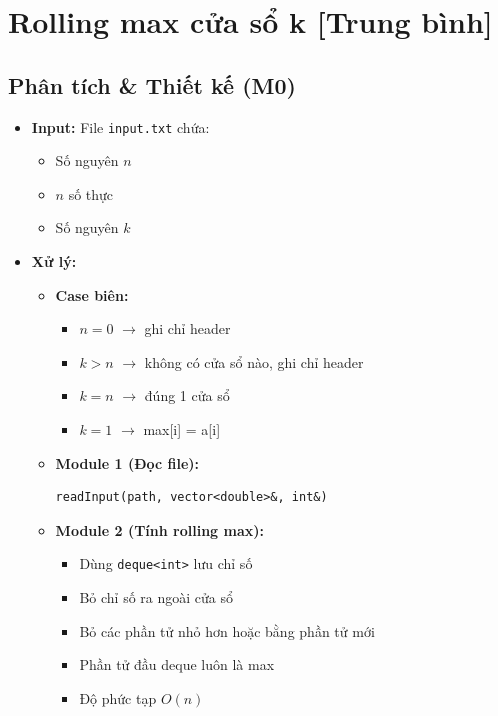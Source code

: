 \section{Rolling max cửa sổ k [Trung bình]}
\subsection{Phân tích \& Thiết kế (M0)}

\begin{itemize}
    \item \textbf{Input:} File \texttt{input.txt} chứa:
    \begin{itemize}
        \item Số nguyên $n$
        \item $n$ số thực
        \item Số nguyên $k$
    \end{itemize}

    \item \textbf{Xử lý:}
    \begin{itemize}
        \item \textbf{Case biên:}
        \begin{itemize}
            \item $n=0$ $\rightarrow$ ghi chỉ header
            \item $k>n$ $\rightarrow$ không có cửa sổ nào, ghi chỉ header
            \item $k=n$ $\rightarrow$ đúng 1 cửa sổ
            \item $k=1$ $\rightarrow$ max[i] = a[i]
        \end{itemize}

        \item \textbf{Module 1 (Đọc file):}
\begin{lstlisting}
readInput(path, vector<double>&, int&)
\end{lstlisting}

        \item \textbf{Module 2 (Tính rolling max):}
        \begin{itemize}
            \item Dùng \texttt{deque<int>} lưu chỉ số
            \item Bỏ chỉ số ra ngoài cửa sổ
            \item Bỏ các phần tử nhỏ hơn hoặc bằng phần tử mới
            \item Phần tử đầu deque luôn là max
            \item Độ phức tạp $O(n)$
        \end{itemize}


\end{itemize}
\end{itemize}
